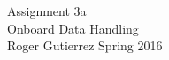 \begin{titlepage}
\begin{flushright}
\begin{figure} [t]

\end{figure}
\end{flushright}
 \begin{center}
  \vspace*{1.5cm}
  \Large Assignment 3a \\Onboard Data Handling	%
  \vfill
  \textbf{\huge \thesistitle}\\    %
  \vspace{2cm}
  \Large { Roger Gutierrez }
  \vspace{1cm}
  \Large Spring 2016				%
 \end{center}
 \vfill\vfill\vfill

\end{titlepage}
